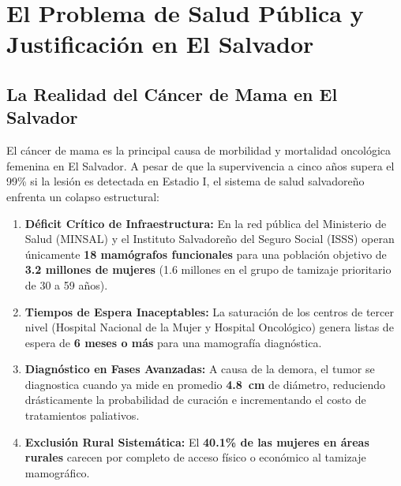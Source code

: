 \documentclass[11pt,a4paper]{article}
\begin{document}
\section{El Problema de Salud Pública y Justificación en El Salvador}

\subsection{La Realidad del Cáncer de Mama en El Salvador}
El cáncer de mama es la principal causa de morbilidad y mortalidad oncológica femenina en El Salvador. A pesar de que la supervivencia a cinco años supera el 99\% si la lesión es detectada en Estadio I, el sistema de salud salvadoreño enfrenta un colapso estructural:
\begin{enumerate}
    \item \textbf{Déficit Crítico de Infraestructura:} En la red pública del Ministerio de Salud (MINSAL) y el Instituto Salvadoreño del Seguro Social (ISSS) operan únicamente \textbf{18 mamógrafos funcionales} para una población objetivo de \textbf{3.2 millones de mujeres} (1.6 millones en el grupo de tamizaje prioritario de 30 a 59 años).
    \item \textbf{Tiempos de Espera Inaceptables:} La saturación de los centros de tercer nivel (Hospital Nacional de la Mujer y Hospital Oncológico) genera listas de espera de \textbf{6 meses o más} para una mamografía diagnóstica.
    \item \textbf{Diagnóstico en Fases Avanzadas:} A causa de la demora, el tumor se diagnostica cuando ya mide en promedio \textbf{4.8~cm} de diámetro, reduciendo drásticamente la probabilidad de curación e incrementando el costo de tratamientos paliativos.
    \item \textbf{Exclusión Rural Sistemática:} El \textbf{40.1\% de las mujeres en áreas rurales} carecen por completo de acceso físico o económico al tamizaje mamográfico.
\end{enumerate}
\end{document}
